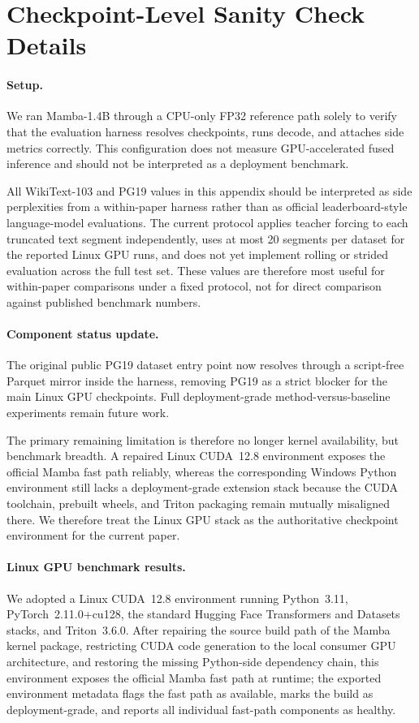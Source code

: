 \section{Checkpoint-Level Sanity Check Details}
\label{sec:appendix_ckpt}

\paragraph{Setup.}
We ran Mamba-1.4B through a CPU-only FP32 reference path solely to verify that the evaluation harness resolves checkpoints, runs decode, and attaches side metrics correctly. This configuration does not measure GPU-accelerated fused inference and should not be interpreted as a deployment benchmark.

All WikiText-103 and PG19 values in this appendix should be interpreted as side perplexities from a within-paper harness rather than as official leaderboard-style language-model evaluations. The current protocol applies teacher forcing to each truncated text segment independently, uses at most 20 segments per dataset for the reported Linux GPU runs, and does not yet implement rolling or strided evaluation across the full test set. These values are therefore most useful for within-paper comparisons under a fixed protocol, not for direct comparison against published benchmark numbers.

\paragraph{Component status update.}
The original public PG19 dataset entry point now resolves through a script-free Parquet mirror inside the harness, removing PG19 as a strict blocker for the main Linux GPU checkpoints. Full deployment-grade method-versus-baseline experiments remain future work.

The primary remaining limitation is therefore no longer kernel availability, but benchmark breadth. A repaired Linux CUDA~12.8 environment exposes the official Mamba fast path reliably, whereas the corresponding Windows Python environment still lacks a deployment-grade extension stack because the CUDA toolchain, prebuilt wheels, and Triton packaging remain mutually misaligned there. We therefore treat the Linux GPU stack as the authoritative checkpoint environment for the current paper.

\paragraph{Linux GPU benchmark results.}
We adopted a Linux CUDA~12.8 environment running Python~3.11, PyTorch~2.11.0+cu128, the standard Hugging Face Transformers and Datasets stacks, and Triton~3.6.0. After repairing the source build path of the Mamba kernel package, restricting CUDA code generation to the local consumer GPU architecture, and restoring the missing Python-side dependency chain, this environment exposes the official Mamba fast path at runtime; the exported environment metadata flags the fast path as available, marks the build as deployment-grade, and reports all individual fast-path components as healthy.

